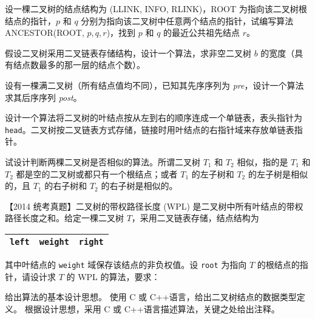 \begin{qitems}
    \begin{bbox}
        \qitem 设一棵二叉树的结点结构为 (LLINK, INFO, RLINK)，ROOT 为指向该二叉树根结点的指针，$p$ 和 $q$ 分别为指向该二叉树中任意两个结点的指针，试编写算法 ANCESTOR(ROOT, $p, q, r$)，找到 $p$ 和 $q$ 的最近公共祖先结点 $r$。
    \end{bbox}

    \begin{bbox}
        \qitem 假设二叉树采用二叉链表存储结构，设计一个算法，求非空二叉树 $b$ 的宽度（具有结点数最多的那一层的结点个数）。
    \end{bbox}

    \begin{bbox}
        \qitem 设有一棵满二叉树（所有结点值均不同），已知其先序序列为 \textit{pre}，设计一个算法求其后序序列 \textit{post}。
    \end{bbox}

    \begin{bbox}
        \qitem 设计一个算法将二叉树的叶结点按从左到右的顺序连成一个单链表，表头指针为 \texttt{head}。二叉树按二叉链表方式存储，链接时用叶结点的右指针域来存放单链表指针。
    \end{bbox}

    \begin{bbox}
        \qitem 试设计判断两棵二叉树是否相似的算法。所谓二叉树 $T_1$ 和 $T_2$ 相似，指的是 $T_1$ 和 $T_2$ 都是空的二叉树或都只有一个根结点；或者 $T_1$ 的左子树和 $T_2$ 的左子树是相似的，且 $T_1$ 的右子树和 $T_2$ 的右子树是相似的。
    \end{bbox}

    \begin{bbox}
        \qitem 【2014 统考真题】二叉树的带权路径长度 (WPL) 是二叉树中所有叶结点的带权路径长度之和。给定一棵二叉树 $T$，采用二叉链表存储，结点结构为
        \begin{center}
            \begin{tabular}{|c|c|c|}
            \hline
            \texttt{left} & \texttt{weight} & \texttt{right} \\
            \hline
            \end{tabular}
        \end{center}
        其中叶结点的 \texttt{weight} 域保存该结点的非负权值。设 \texttt{root} 为指向 $T$ 的根结点的指针，请设计求 $T$ 的 WPL 的算法，要求：
        \begin{subqitems}
            \subqitem 给出算法的基本设计思想。
            \subqitem 使用 C 或 C++语言，给出二叉树结点的数据类型定义。
            \subqitem 根据设计思想，采用 C 或 C++语言描述算法，关键之处给出注释。
        \end{subqitems}
    \end{bbox}


\end{qitems}
